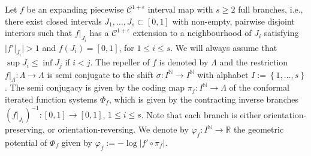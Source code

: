 \documentclass[11pt]{amsart}
\newcommand{\1}{1}
\newcommand{\N}{\mathbb{N}}
\newcommand{\R}{\mathbb{R}}
\begin{document}
Let $f$ be an expanding
piecewise $\mathcal{C}^{1+\epsilon}$ interval map with $s\ge2$ full
branches, i.e., there exist closed intervals $J_{1},\dots,J_{s}\subset[0,1]$
with non-empty, pairwise disjoint interiors such that $f|_{J_{i}}$
has a $\mathcal{C}^{1+\epsilon}$ extension to a neighbourhood of
$J_{i}$ satisfying $|f'|_{J_{i}}|>1$ and $f(J_{i})=[0,1]$, for $1\le i\le s$.
We will always assume that $\sup J_{i}\le\inf J_{j}$ if $i<j$.
The repeller of $f$ is denoted by $\Lambda$ and the restriction
$f|_{\Lambda}:\Lambda\rightarrow\Lambda$ is semi conjugate to the shift
$\sigma:I^{\N}\rightarrow I^{\N}$ with alphabet $I:=\left\{ 1,\dots,s\right\} $.
The semi conjugacy is given by the coding map $\pi_{f}:I^{\N}\rightarrow\Lambda$
of the conformal iterated function systems $\Phi_{f}$, which is given
by the contracting inverse branches $(f|_{J_{i}})^{-1}:[0,1]\rightarrow [0,1]$,
$1\le i\le s$. 
Note that each branch is either orientation-preserving, or orientation-reversing.  We denote by $\varphi_{f}:I^{\N}\rightarrow\R$
the geometric potential of $\Phi_{f}$ given by $\varphi_{f}:=-\log |f'\circ\pi_{f}|$. 
\end{document}
